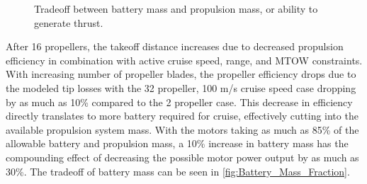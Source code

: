 \documentclass[conf]{new-aiaa}
\begin{document}
\begin{figure}[H]
    \centering
    \qquad
    \caption{Tradeoff between battery mass and propulsion mass, or ability to generate thrust.}
    \label{fig:Thrust_Battery}
\end{figure}



After 16 propellers, the takeoff distance increases due to decreased propulsion efficiency in combination with active cruise speed, range, and MTOW constraints. With increasing number of propeller blades, the propeller efficiency drops due to the modeled tip losses with the 32 propeller, 100 m/s cruise speed case dropping by as much as 10\% compared to the 2 propeller case. This decrease in efficiency directly translates to more battery required for cruise, effectively cutting into the available propulsion system mass. With the motors taking as much as 85\% of the allowable battery and propulsion mass, a 10\% increase in battery mass has the compounding effect of decreasing the possible motor power output by as much as 30\%. The tradeoff of battery mass can be seen in \cref{fig:Battery_Mass_Fraction}.
\end{document}
